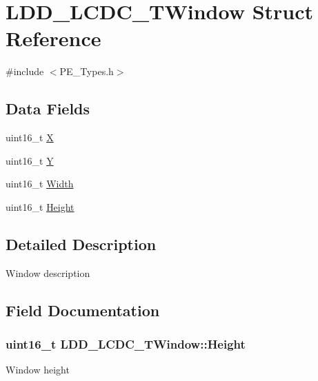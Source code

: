 \hypertarget{struct_l_d_d___l_c_d_c___t_window}{}\section{L\+D\+D\+\_\+\+L\+C\+D\+C\+\_\+\+T\+Window Struct Reference}
\label{struct_l_d_d___l_c_d_c___t_window}


{\ttfamily \#include $<$P\+E\+\_\+\+Types.\+h$>$}

\subsection*{Data Fields}
\begin{DoxyCompactItemize}
\item 
uint16\+\_\+t \hyperlink{struct_l_d_d___l_c_d_c___t_window_a9dd1270e9794b4dbd79b2b30afca87c9}{X}
\item 
uint16\+\_\+t \hyperlink{struct_l_d_d___l_c_d_c___t_window_af64f532d1fb5899c563ba40df90867d8}{Y}
\item 
uint16\+\_\+t \hyperlink{struct_l_d_d___l_c_d_c___t_window_a53ee53813f5884a400be8ca3093233c4}{Width}
\item 
uint16\+\_\+t \hyperlink{struct_l_d_d___l_c_d_c___t_window_abe1dbefb6d43373336fa414b88a79cc2}{Height}
\end{DoxyCompactItemize}


\subsection{Detailed Description}
Window description 

\subsection{Field Documentation}
\hypertarget{struct_l_d_d___l_c_d_c___t_window_abe1dbefb6d43373336fa414b88a79cc2}{}
\subsubsection[{Height}]{\setlength{\rightskip}{0pt plus 5cm}uint16\+\_\+t L\+D\+D\+\_\+\+L\+C\+D\+C\+\_\+\+T\+Window\+::\+Height}\label{struct_l_d_d___l_c_d_c___t_window_abe1dbefb6d43373336fa414b88a79cc2}
Window height \hypertarget{struct_l_d_d___l_c_d_c___t_window_a53ee53813f5884a400be8ca3093233c4}{}
